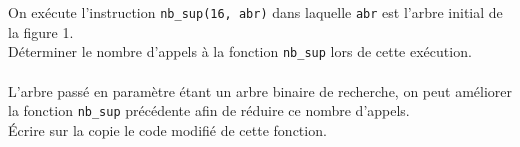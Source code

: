 \documentclass[a4paper,12pt,article,firamath]{nsi}
\begin{document}
On exécute l’instruction \texttt{nb_sup(16, abr)} dans laquelle \texttt{abr} est l’arbre initial de la figure 1.\\

\question Déterminer le nombre d’appels à la fonction \texttt{nb_sup} lors de cette exécution.\\

\\

L’arbre passé en paramètre étant un arbre binaire de recherche, on peut
améliorer la fonction \texttt{nb_sup} précédente afin de réduire ce nombre d’appels.\\

\question Écrire sur la copie le code modifié de cette fonction. 

\end{document}
